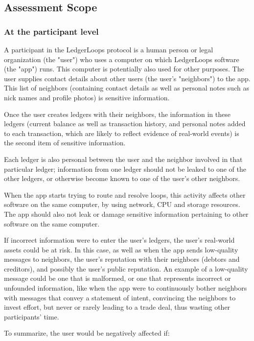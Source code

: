 \documentclass[11pt,twoside,a4paper]{article}
\begin{document}
\subsection{Assessment Scope}
\subsubsection{At the participant level}
A participant in the LedgerLoops protocol is a human person or legal organization (the "user") who uses a computer on which LedgerLoops software (the "app") runs. This computer is potentially also used for other purposes. The user supplies contact details about other users (the user's "neighbors") to the app. This list of neighbors (containing contact details as well as personal notes such as nick names and profile photos) is sensitive information.

Once the user creates ledgers with their neighbors, the information in these ledgers (current balance as well as transaction history, and personal notes added to each transaction, which are likely to reflect evidence of real-world events) is the second item of sensitive information.

Each ledger is also personal between the user and the neighbor involved in that particular ledger; information from one ledger should not be leaked to one of the other ledgers, or otherwise become known to one of the user's other neighbors.

When the app starts trying to route and resolve loops, this activity affects other software on the same computer, by using network, CPU and storage resources. The app should also not leak or damage sensitive information pertaining to other software on the same computer.

If incorrect information were to enter the user's ledgers, the user's real-world assets could be at risk.
In this case, as well as when the app sends low-quality messages to neighbors, the user's reputation with their neighbors (debtors and creditors), and possibly the user's public reputation. An example of a low-quality message could be one that is malformed, or one that represents incorrect or unfounded information, like when the app were to continuously bother neighbors with messages that convey a statement of intent, convincing the neighbors to invest effort, but never or rarely leading to a trade deal, thus wasting other participants' time.

To summarize, the user would be negatively affected if:
\end{document}
